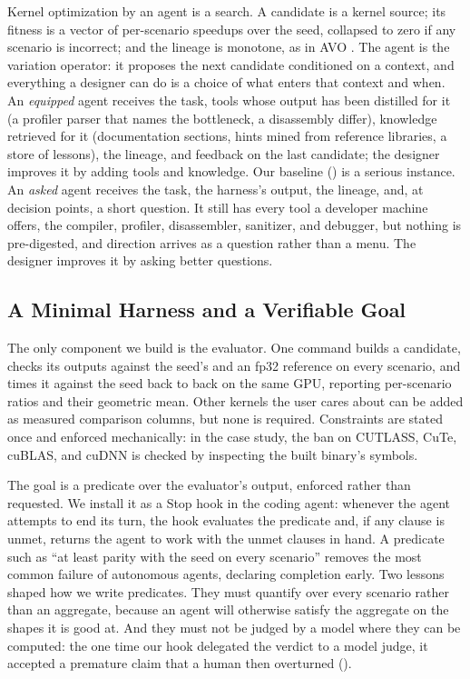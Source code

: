 Kernel optimization by an agent is a search. A candidate is a kernel source; its fitness is a vector
of per-scenario speedups over the seed, collapsed to zero if any scenario is incorrect; and the
lineage is monotone, as in AVO \cite{chen2026avo}. The agent is the variation operator: it proposes
the next candidate conditioned on a context, and everything a designer can do is a choice of what
enters that context and when. An \emph{equipped} agent receives the task, tools whose output has
been distilled for it (a profiler parser that names the bottleneck, a disassembly differ), knowledge
retrieved for it (documentation sections, hints mined from reference libraries, a store of lessons),
the lineage, and feedback on the last candidate; the designer improves it by adding tools and
knowledge. Our baseline () is a serious instance. An \emph{asked} agent receives
the task, the harness's output, the lineage, and, at decision points, a short question. It still has
every tool a developer machine offers, the compiler, profiler, disassembler, sanitizer, and
debugger, but nothing is pre-digested, and direction arrives as a question rather than a menu. The
designer improves it by asking better questions.

\subsection{A Minimal Harness and a Verifiable Goal}
\label{kernelseek:sec:workflow-harness}

The only component we build is the evaluator. One command builds a candidate, checks its outputs
against the seed's and an fp32 reference on every scenario, and times it against the seed back to
back on the same GPU, reporting per-scenario ratios and their geometric mean. Other kernels the user
cares about can be added as measured comparison columns, but none is required. Constraints are
stated once and enforced mechanically: in the case study, the ban on CUTLASS, CuTe, cuBLAS, and
cuDNN is checked by inspecting the built binary's symbols.

The goal is a predicate over the evaluator's output, enforced rather than requested. We install it
as a Stop hook in the coding agent: whenever the agent attempts to end its turn, the hook evaluates
the predicate and, if any clause is unmet, returns the agent to work with the unmet clauses in hand.
A predicate such as ``at least parity with the seed on every scenario'' removes the most common
failure of autonomous agents, declaring completion early. Two lessons shaped how we write
predicates. They must quantify over every scenario rather than an aggregate, because an agent will
otherwise satisfy the aggregate on the shapes it is good at. And they must not be judged by a model
where they can be computed: the one time our hook delegated the verdict to a model judge, it
accepted a premature claim that a human then overturned ().

